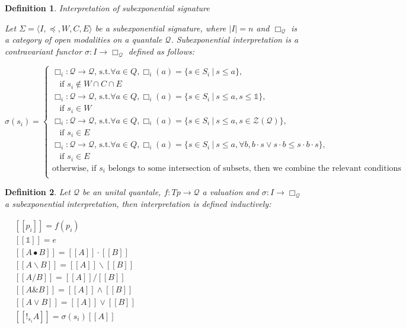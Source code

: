 \documentclass[a4paper]{article}
\theoremstyle{defin}
\newtheorem{defin}{Definition}
\theoremstyle{theorem}
\theoremstyle{prop}
\theoremstyle{lemma}
\theoremstyle{ex}
\theoremstyle{col}
\begin{document}
\begin{defin} Interpretation of subexponential signature

  Let $\Sigma = \langle I, \preceq, W, C, E \rangle$ be a subexponential signature, where $|I| = n$ and
  $\Box_{\mathcal{Q}}$ is a category of open modalities on a quantale $\mathcal{Q}$.
  Subexponential interpretation is a contravariant functor $\sigma : I \to \Box_{\mathcal{Q}}$ defined as follows:

  $\sigma(s_i) = \begin{cases}
  \Box_i : \mathcal{Q} \to \mathcal{Q} \text{, s.t.} \forall a \in Q, \Box_i(a) = \{ s \in S_i \: | \: s \leq a\},
  \\ \:\:\:\: \text{if $s_i \notin W \cap C \cap E$} \\
  \Box_i : \mathcal{Q} \to \mathcal{Q} \text{, s.t.} \forall a \in Q, \Box_i(a) = \{ s \in S_i \: | \: s \leq a, s \leq \mathds{1}\},
  \\ \:\:\:\: \text{if $s_i \in W$} \\
  \Box_i : \mathcal{Q} \to \mathcal{Q} \text{, s.t.} \forall a \in Q, \Box_i(a) = \{ s \in S_i \: | \: s \leq a, s \in \mathcal{Z}(\mathcal{Q}) \},
  \\ \:\:\:\: \text{if $s_i \in E$} \\
  \Box_i : \mathcal{Q} \to \mathcal{Q} \text{, s.t.} \forall a \in Q, \Box_i(a) = \{ s \in S_i \: | \: s \leq a, \forall b, b \cdot s \vee s \cdot b \leq s \cdot b \cdot s \},
  \\ \:\:\:\: \text{if $s_i \in E$} \\
  \text{otherwise, if $s_i$ belongs to some intersection of subsets, then we combine the relevant conditions } \\
  \end{cases}$
\end{defin}

\begin{defin} Let $\mathcal{Q}$ be an unital quantale, $f : Tp \to \mathcal{Q}$ a valuation and $\sigma : I \to \Box_{\mathcal{Q}}$ a subexponential interpretation, then
  interpretation is defined inductively:

\begin{center}
$\begin{array}{lll}
& [\![p_i]\!] = f(p_i)&\\
& [\![\mathds{1}]\!] = e & \\
&[\![A \bullet B]\!] = [\![A]\!] \cdot [\![B]\!] & \\
&[\![A \backslash B]\!] = [\![A]\!] \backslash [\![B]\!] & \\
&[\![A / B]\!] = [\![A]\!] / [\![B]\!]& \\
&[\![A \& B]\!] = [\![A]\!] \wedge [\![B]\!]& \\
&[\![A \vee B]\!] = [\![A]\!] \vee [\![B]\!]& \\
&[\![!_{s_i} A]\!] = \sigma(s_i) [\![A]\!]&
\end{array}$
\end{center}
\end{defin}
\end{document}
